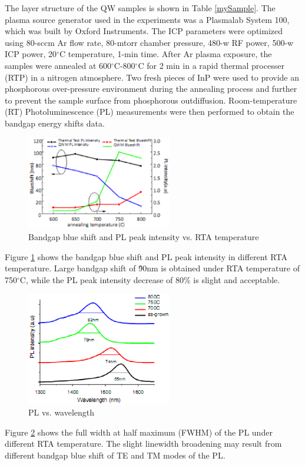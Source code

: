 The layer structure of the QW samples is shown in Table
\ref{mySample}. The plasma source generator used in the experiments
was a Plasmalab System 100, which was built by Oxford Instruments.
The ICP parameters were optimized using 80-sccm Ar flow rate,
80-mtorr chamber pressure, 480-w RF power, 500-w ICP power,
20$^\circ$C temperature, 1-min time. After Ar plasma exposure, the
samples were annealed at 600$^\circ$C-800$^\circ$C for 2 min in a
rapid thermal processer (RTP) in a nitrogen atmosphere. Two fresh
pieces of InP were used to provide an phosphorous over-pressure
environment during the annealing process and further to prevent the
sample surface from phosphorous outdiffusion. Room-temperature (RT)
Photoluminescence (PL) measurements were then performed to obtain
the bandgap energy shifts data.

\begin{figure}[!t]
    \centering
    \includegraphics[width=2.5in]{fig/rta1}
    \caption{Bandgap blue shift and PL peak intensity vs. RTA temperature}
    \label{ex_rta1}
\end{figure}
Figure \ref{ex_rta1} shows the bandgap blue shift and PL peak
intensity in different RTA temperature. Large bandgap shift of
\~90nm is obtained under RTA temperature of 750$^\circ$C, while the
PL peak intensity decrease of 80\% is slight and acceptable.

\begin{figure}[!t]
    \centering
    \includegraphics[width=2.5in]{fig/rta2}
    \caption{PL vs. wavelength}
    \label{ex_rta2}
\end{figure}
Figure \ref{ex_rta2} shows the full width at half maximum (FWHM) of
the PL under different RTA temperature. The slight linewidth
broadening may result from different bandgap blue shift of TE and TM
modes of the PL.
